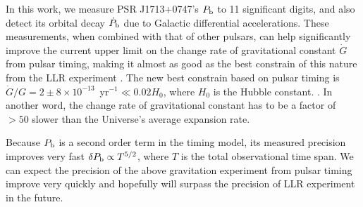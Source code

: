 In this work, we measure PSR J1713+0747's $P_{\rm b}$ to 11 significant
digits, and also detect its orbital decay $\dot{P}_{\rm b}$ due to Galactic differential accelerations.
These measurements, when combined with that of other pulsars, can help
significantly improve the current upper limit on the change rate of gravitational
 constant $\dot{G}$ from pulsar timing, making it almost as good as the best
constrain of this nature from the LLR experiment \citep{hmb10}.
The new best constrain based on pulsar timing is $\dot{G}/G
=2\pm8\times10^{-13}$~yr$^{-1}\ll0.02H_0$, where $H_0$ is the Hubble constant. . 
In another word, the change rate of gravitational constant has to be a factor of $>50$
slower than the Universe's average expansion rate.

Because $P_{\rm b}$ is a second order term in the timing 
model, its measured precision improves very fast $\delta
P_{\rm b} \propto T^{5/2}$, where $T$ is the total observational time span.
We can expect the precision of the above gravitation experiment from pulsar
timing improve very quickly and hopefully will surpass the precision of LLR
experiment in the future.
